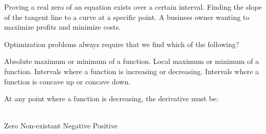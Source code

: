 \documentclass{exam}
\begin{document}
\begin{questions}
\begin{choices}
\choice Proving a real zero of an equation exists over a certain interval.
\choice Finding the slope of the tangent line to a curve at a specific point.
\choice A business owner wanting to maximize profits and minimize costs.
\end{choices}
\question
Optimization problems always require that we find which of the following?
\begin{choices}
\choice Absolute maximum or minimum of a function.
\choice Local maximum or minimum of a function.
\choice Intervals where a function is increasing or decreasing.
\choice Intervals where a function is concave up or concave down.
\end{choices}
\question At any point where a function is decreasing, the derivative must be:
\begin{oneparchoices}\\
\choice Zero
\choice Non-existant
\choice Negative
\choice Positive
\end{oneparchoices}
\end{questions}
\end{document}
